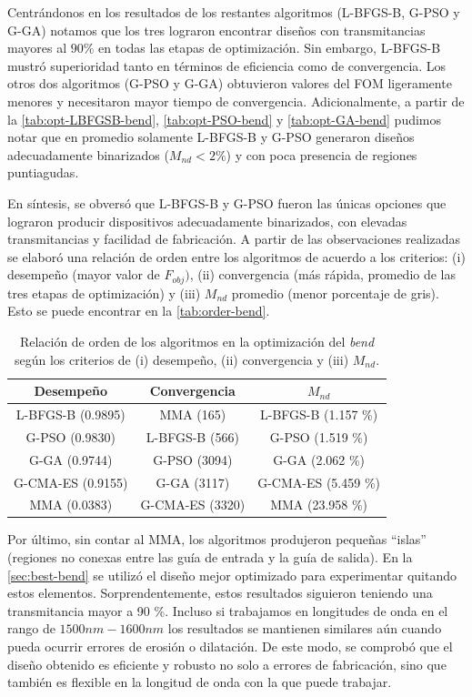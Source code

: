 Centrándonos en los resultados de los restantes algoritmos (L-BFGS-B, G-PSO y G-GA)
notamos que los tres lograron encontrar diseños con transmitancias mayores al $90 \%$
en todas las etapas de optimización. Sin embargo, L-BFGS-B mustró superioridad 
tanto en términos de eficiencia como de convergencia. Los otros dos algoritmos (G-PSO y G-GA)
obtuvieron valores del FOM ligeramente menores y necesitaron mayor tiempo de convergencia.
Adicionalmente, a partir de la \autoref{tab:opt-LBFGSB-bend}, \autoref{tab:opt-PSO-bend} y
\autoref{tab:opt-GA-bend} pudimos notar que en promedio solamente L-BFGS-B y G-PSO
generaron diseños adecuadamente binarizados ($M_{nd} < 2 \%$) y con poca presencia de regiones
puntiagudas.

En síntesis, se obversó que L-BFGS-B y G-PSO fueron las únicas opciones que lograron
producir dispositivos adecuadamente binarizados, con elevadas transmitancias y 
facilidad de fabricación.
A partir de las observaciones realizadas se elaboró una relación de orden entre los 
algoritmos de acuerdo a los criterios: 
(i) desempeño (mayor valor de $F_{obj})$, 
(ii) convergencia (más rápida, promedio de las tres etapas de optimización) y 
(iii) $M_{nd}$ promedio (menor porcentaje de gris).
Esto se puede encontrar en la \autoref{tab:order-bend}.

\begin{table}[ht]
    \centering
    \begin{tabular}{|c|c|c|}
    \hline 
    Desempeño &  Convergencia & $M_{nd} $\\
    \hline 
      L-BFGS-B (0.9895) & MMA (165)           &  L-BFGS-B (1.157 \%) \\
      G-PSO (0.9830)    & L-BFGS-B (566)    & G-PSO (1.519 \%) \\
      G-GA (0.9744)     & G-PSO (3094)    & G-GA (2.062 \%) \\
      G-CMA-ES (0.9155) & G-GA (3117)     & G-CMA-ES (5.459 \%) \\
      MMA (0.0383)      & G-CMA-ES (3320) & MMA (23.958 \%) \\
    \hline 
    \end{tabular}
    \caption{Relación de orden de los algoritmos en la optimización del \emph{bend} según
             los criterios de (i) desempeño, (ii) convergencia y (iii) $M_{nd}$.}
    \label{tab:order-bend}
\end{table}


Por último, sin contar al MMA, los algoritmos produjeron pequeñas ``islas''
(regiones no conexas entre las guía de entrada y la guía de salida).
En la \autoref{sec:best-bend} se utilizó el diseño mejor optimizado para experimentar
quitando estos elementos. 
Sorprendentemente, estos resultados siguieron teniendo una transmitancia
mayor a 90 \%.
Incluso si trabajamos en longitudes de onda en el rango de $1500nm-1600nm$
los resultados se mantienen similares aún cuando pueda ocurrir errores de erosión o dilatación.
De este modo, se comprobó que el diseño obtenido es eficiente y robusto no solo a errores
de fabricación, sino que también es flexible en la longitud de onda con la que puede trabajar.

